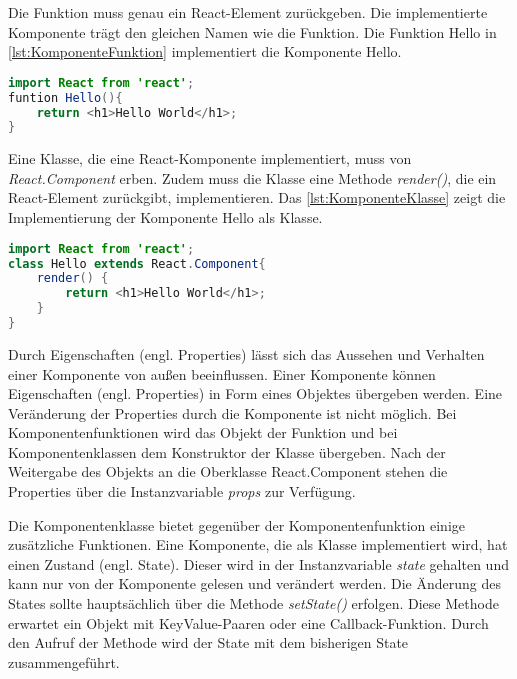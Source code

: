 Die Funktion muss genau ein React-Element zurückgeben. Die implementierte Komponente trägt den gleichen Namen wie die Funktion. Die Funktion Hello in \autoref{lst:KomponenteFunktion} implementiert die Komponente Hello.

\begin{lstlisting}[caption=Beispiel einer Komponente als Funktion, label=lst:KomponenteFunktion, language=Java]
import React from 'react';
funtion Hello(){
	return <h1>Hello World</h1>;
}
\end{lstlisting}

Eine Klasse, die eine React-Komponente implementiert, muss von \textit{React.Component} erben. Zudem muss die Klasse eine Methode \textit{render()}, die ein React-Element zurückgibt, implementieren. Das \autoref{lst:KomponenteKlasse} zeigt die Implementierung der Komponente Hello als Klasse.

\begin{lstlisting}[caption=Beispiel einer Komponente als Klasse, label=lst:KomponenteKlasse, language=Java]
import React from 'react';
class Hello extends React.Component{
	render() {
		return <h1>Hello World</h1>;
	}
}
\end{lstlisting}

Durch Eigenschaften (engl. Properties) lässt sich das Aussehen und Verhalten einer Komponente von außen beeinflussen. Einer Komponente können Eigenschaften (engl. Properties) in Form eines Objektes übergeben werden. Eine Veränderung der Properties durch die Komponente ist nicht möglich. Bei Komponentenfunktionen wird das Objekt der Funktion und bei Komponentenklassen dem Konstruktor der Klasse übergeben. Nach der Weitergabe des Objekts an die Oberklasse React.Component stehen die Properties über die Instanzvariable \textit{props} zur Verfügung. 



Die Komponentenklasse bietet gegenüber der Komponentenfunktion einige zusätzliche Funktionen. Eine  Komponente, die als Klasse implementiert wird, hat einen Zustand (engl. State). Dieser wird in der Instanzvariable \textit{state} gehalten und kann nur von der Komponente gelesen und verändert werden. Die Änderung des States sollte hauptsächlich über die Methode \textit{setState()} erfolgen. Diese Methode  erwartet ein Objekt mit KeyValue-Paaren oder eine Callback-Funktion. Durch den Aufruf der Methode wird der State mit dem bisherigen State zusammengeführt.

